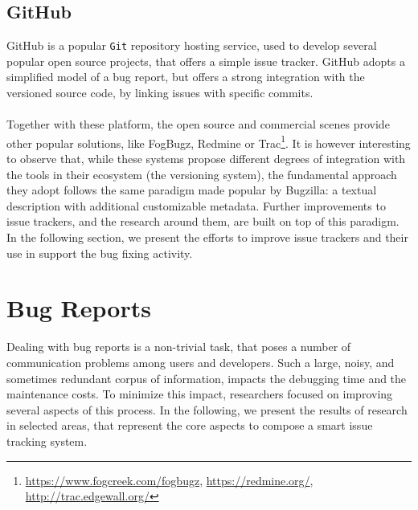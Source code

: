 \subsection{GitHub} GitHub is a popular \texttt{Git} repository hosting service, used to develop several popular open source projects, that offers a simple issue tracker. GitHub adopts a simplified model of a bug report, but offers a strong integration with the versioned source code, by linking issues with specific commits.


\paragraph{}
Together with these platform, the open source and commercial scenes provide other popular solutions, like FogBugz, Redmine or Trac\footnote{\url{https://www.fogcreek.com/fogbugz}, \url{https://redmine.org/}, \url{http://trac.edgewall.org/}}. It is however interesting to observe that, while these systems propose different degrees of integration with the tools in their ecosystem (\eg the versioning system), the fundamental approach they adopt follows the same paradigm made popular by Bugzilla: a textual description with additional customizable metadata. Further improvements to issue trackers, and the research around them, are built on top of this paradigm. In the following section, we present the efforts to improve issue trackers and their use in support the bug fixing activity.


\section{Bug Reports}

Dealing with bug reports is a non-trivial task, that poses a number of communication problems among users and developers. Such a large, noisy, and sometimes redundant corpus of information, impacts the debugging time and the maintenance costs. To minimize this impact, researchers focused on improving several aspects of this process. In the following, we present the results of research in selected areas, that represent the core aspects to compose a smart issue tracking system.


